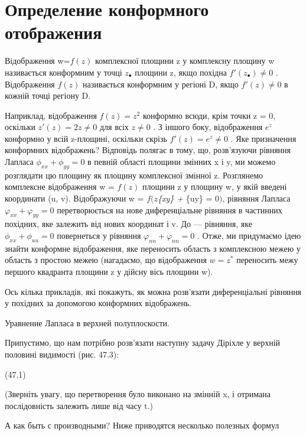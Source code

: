 \documentclass[
  ukrainian,
]{article}
\begin{document}
\section{Определение конформного
отображения}\label{ux43eux43fux440ux435ux434ux435ux43bux435ux43dux438ux435-ux43aux43eux43dux444ux43eux440ux43cux43dux43eux433ux43e-ux43eux442ux43eux431ux440ux430ux436ux435ux43dux438ux44f}

Відображення w=\(f(z)\) комплексної площини z у комплексну площину w
називається конформним у точці \(z_{\bullet}\) площини z, якщо похідна
\(f'(z_{\bullet}) \neq 0\) . Відображення \(f(z)\) називається
конформним у регіоні D, якщо \(f'(z) \neq 0\) в кожній точці регіону D.

Наприклад, відображення \(f(z) = z^2\) конформно всюди, крім точки z =
0, оскільки \(z'(z) = 2z \neq 0\) для всіх \(z \neq 0\) . З іншого боку,
відображення \(e^z\) конформно у всій z-площині, оскільки скрізь
\(f'(z) = e^z \neq 0\) . Яке призначення конформних відображень?
Відповідь полягає в тому, що, розв'язуючи рівняння Лапласа
\(\phi_{xx} + \phi_{yy} = 0\) в певній області площини змінних x і y, ми
можемо розглядати цю площину як площину комплексної змінної z.
Розглянемо комплексне відображення w = \(f(z)\) площини z у площину w, у
якій введені координати (u, v). Відображуючи w = \(f(z\)\phi\emph{\{xy\}
+ \phi}\{uy\} = 0\()\), рівняння Лапласа
\(\varphi_{xx} + \varphi_{yy} = 0\) перетворюється на нове
диференціальне рівняння в частинних похідних, яке залежить від нових
координат і v. До --- рівняння, яке \(\phi_{xx} + \phi_{uu} = 0\)
повернеться у рівняння \(\varphi_{nn} + \varphi_{nn} = 0\) . Отже, ми
придумаємо ідею знайти конформне відображення, яке переносить область з
комплексною межею у область з простою межею (нагадаємо, що відображення
\(w=z^*\) переносить межу першого квадранта площини z у дійсну вісь
площини w).

Ось кілька прикладів, які покажуть, як можна розв'язати диференціальні
рівняння у похідних за допомогою конформних відображень.

Уравнение Лапласа в верхней полуплоскости.

Припустимо, що нам потрібно розв'язати наступну задачу Діріхле у верхній
половині видимості (рис. 47.3):

(47.1)

(Зверніть увагу, що перетворення було виконано на змінній x, і отримана
послідовність залежить лише від часу t.)

А как быть с производными? Ниже приводятся несколько полезных формул
\end{document}

